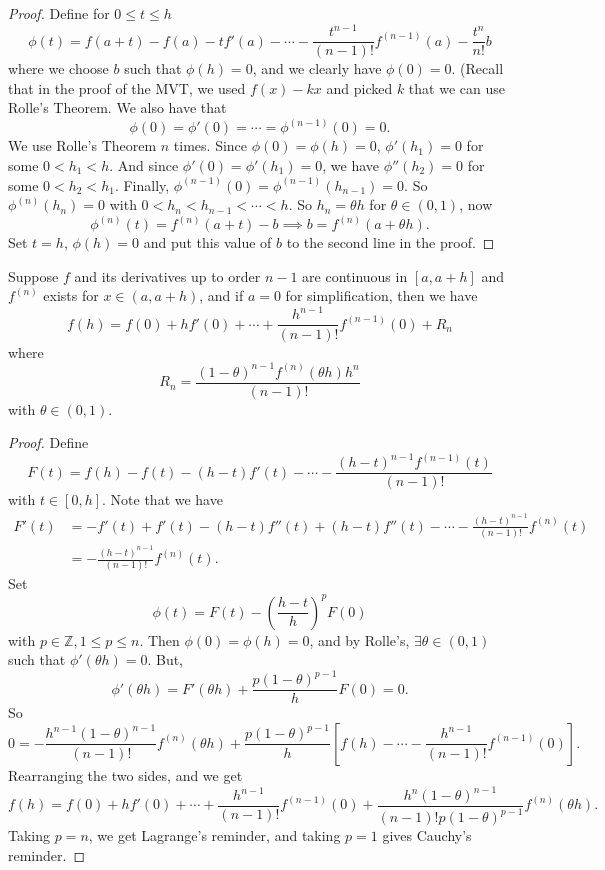 \begin{proof}
    Define for \(0 \leq t \leq h\)
    \[
        \phi(t) = f(a + t) - f(a) - tf'(a) - \cdots -\frac{t^{n-1}}{(n-1)!}f^{(n-1)}(a) - \frac{t^n}{n!}b
    \]
    where we choose \(b\) such that \(\phi(h) = 0\), and we clearly have \(\phi(0) = 0\). (Recall that in the proof of the MVT, we used \(f(x) - kx\) and picked \(k\) that we can use Rolle's Theorem. We also have that
    \[\phi(0) = \phi'(0) = \cdots = \phi^{(n-1)}(0) = 0.\] We use Rolle's Theorem \(n\) times. Since \(\phi(0) = \phi(h) = 0\), \(\phi'(h_1) = 0\) for some \(0 < h_1 < h\). And since \(\phi'(0) = \phi'(h_1) = 0\), we have \(\phi''(h_2) = 0\) for some \(0 < h_2 < h_1\). Finally, \(\phi^{(n-1)}(0) = \phi^{(n-1)}(h_{n-1}) = 0\). So \(\phi^{(n)}(h_n)=0\) with \(0<h_n < h_{n-1} < \cdots < h\). So \(h_n = \theta h\) for \(\theta \in (0,1)\), now
    \[
        \phi^{(n)}(t) = f^{(n)}(a + t) - b \implies b = f^{(n)}(a + \theta h).
    \]
    Set \(t = h\), \(\phi(h) = 0\) and put this value of \(b\) to the second line in the proof.
\end{proof}
\begin{theorem}
    \label{tc}
    Suppose \(f\) and its derivatives up to order \(n - 1\) are continuous in \([a, a + h]\) and \(f^{(n)}\) exists for \(x \in (a, a + h)\), and if \(a = 0\) for simplification, then we have
    \[
        f(h) = f(0) + hf'(0) + \cdots + \frac{h^{n-1}}{(n-1)!}f^{(n-1)}(0) + R_n
    \]
    where
    \[
        R_n = \frac{(1-\theta)^{n-1}f^{(n)}(\theta h)h^n}{(n-1)!}
    \]
    with \(\theta \in (0,1)\).
\end{theorem}
\begin{proof}
    Define
    \[
        F(t) = f(h) - f(t) - (h-t)f'(t) - \cdots - \frac{(h-t)^{n-1}f^{(n-1)}(t)}{(n-1)!}
    \]
    with \(t \in [0,h]\). Note that we have
    \begin{align*}
        F'(t) &= -f'(t) + f'(t) - (h-t)f''(t) + (h-t)f''(t) - \cdots -\frac{(h-t)^{n-1}}{(n-1)!}f^{(n)}(t)\\
        &= -\frac{(h-t)^{n-1}}{(n-1)!}f^{(n)}(t).
    \end{align*}
    Set
    \[
        \phi(t) = F(t) - (\frac{h - t}{h})^{p}F(0)
    \]
    with \(p \in \mathbb{Z}, 1 \leq p \leq n\). Then \(\phi(0) = \phi(h) = 0\), and by Rolle's, \(\exists \theta \in (0,1)\) such that \(\phi'(\theta h) = 0\). But,
    \[
        \phi'(\theta h) = F'(\theta h) + \frac{p(1-\theta)^{p-1}}{h}F(0) = 0.
    \]
    So
    \[
        0 = -\frac{h^{n-1}(1-\theta)^{n-1}}{(n-1)!}f^{(n)}(\theta h)+\frac{p(1-\theta)^{p-1}}{h}[f(h) - \cdots - \frac{h^{n-1}}{(n-1)!}f^{(n-1)}(0)].
    \]
    Rearranging the two sides, and we get
    \[
        f(h) = f(0) + hf'(0) + \cdots + \frac{h^{n-1}}{(n-1)!}f^{(n-1)}(0) + \frac{h^n(1-\theta)^{n-1}}{(n-1)!p(1-\theta)^{p-1}}f^{(n)}(\theta h).
    \]
    Taking \(p = n\), we get Lagrange's reminder, and taking \(p = 1\) gives Cauchy's reminder.
\end{proof}